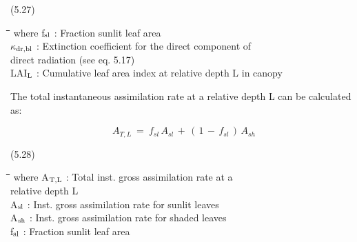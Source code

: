 \documentclass[11pt]{article}
\begin{document}
 \bigskip
\strut\hfill (5.27)
\nwln
\begin{tabbing}
\hspace{1.27cm}\=\hspace{1.27cm}\=\hspace{1.27cm}\=\hspace{1.27cm}\=%
\hspace{1.27cm}\=\hspace{1.27cm}\=\hspace{1.27cm}\=\hspace{1.27cm}\=%
\hspace{1.27cm}\=\hspace{1.27cm}\=\kill
where\> f$_{{\rm sl}}$\> : Fraction sunlit leaf area\> \> \> \> \> \> \> \> [-]\\
\>$\kappa$$_{{\rm dr,bl}}$\> : Extinction coefficient for the direct component of\\
\>\>   direct radiation (see eq. 5.17)\> \> \> \> \> \> \> \> [-]\\
\>LAI$_{{\rm L}}$\> : Cumulative leaf area index at relative depth L in canopy\> \> \> \> \> \> \> \> [-]
\end{tabbing}

      

The total instantaneous assimilation rate at a relative depth L can be calculated as:

\begin{displaymath}
A _{T,L} ~=~ f _{sl} \, A _{sl} \, +\, (\, 1\, -\, f _{sl} \, )\, A _{sh} 
\end{displaymath}

 \bigskip
\strut\hfill (5.28)
\nwln
\begin{tabbing}
\hspace{1.27cm}\=\hspace{1.27cm}\=\hspace{1.27cm}\=\hspace{1.27cm}\=%
\hspace{1.27cm}\=\hspace{1.27cm}\=\hspace{1.27cm}\=\hspace{1.27cm}\=%
\hspace{1.27cm}\=\hspace{1.27cm}\=\kill
where\> A$_{{\rm T,L}}$\> : Total inst. gross assimilation rate at a\\
\>\>   relative depth L\> \> \> \> \> \> \> \> [kg ha$^{{\rm -1}}$ h$^{{\rm -1}}$]\\
\>A$_{{\rm sl}}$\> : Inst. gross assimilation rate for sunlit leaves\> \> \> \> \> \> \> \> [kg ha$^{{\rm -1}}$ h$^{{\rm -1}}$]\\
\>A$_{{\rm sh}}$\> : Inst. gross assimilation rate for shaded leaves\> \> \> \> \> \> \> \> [kg ha$^{{\rm -1}}$ h$^{{\rm -1}}$]\\
\>f$_{{\rm sl}}$\> : Fraction sunlit leaf area\> \> \> \> \> \> \> \> [-]
\end{tabbing}
\end{document}
